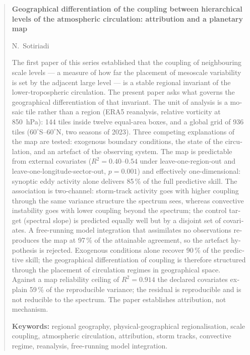\documentclass[11pt,a4paper]{article}
\begin{document}
\begin{english}
\begin{abstract}
\noindent\textbf{Geographical differentiation of the coupling between hierarchical levels of the
atmospheric circulation: attribution and a planetary map}

\smallskip\noindent N.~Sotiriadi

\smallskip\noindent The first paper of this series established that the coupling of neighbouring
scale levels --- a measure of how far the placement of mesoscale variability is set by the adjacent
large level --- is a stable regional invariant of the lower-tropospheric circulation. The present
paper asks what governs the geographical differentiation of that invariant. The unit of analysis is
a mosaic tile rather than a region (ERA5 reanalysis, relative vorticity at 850~hPa): 144 tiles inside
twelve equal-area boxes, and a global grid of 936 tiles ($60^\circ$S--$60^\circ$N, two seasons of
2023). Three competing explanations of the map are tested: exogenous boundary conditions, the state
of the circulation, and an artefact of the observing system. The map is predictable from external
covariates ($R^2=0.40$--$0.54$ under leave-one-region-out and leave-one-longitude-sector-out,
$p=0.001$) and effectively one-dimensional: synoptic eddy activity alone delivers 85\,\% of the full
predictive skill. The association is two-channel: storm-track activity goes with higher coupling
through the same variance structure the spectrum sees, whereas convective instability goes with lower
coupling beyond the spectrum; the control target (spectral slope) is predicted equally well but by a
disjoint set of covariates. A free-running model integration that assimilates no observations
reproduces the map at 97\,\% of the attainable agreement, so the artefact hypothesis is rejected.
Exogenous conditions alone recover 90\,\% of the predictive skill; the geographical differentiation
of coupling is therefore structured through the placement of circulation regimes in geographical
space. Against a map reliability ceiling of $R^2=0.914$ the declared covariates explain 59\,\% of
the reproducible variance; the residual is reproducible and is not reducible to the spectrum. The
paper establishes attribution, not mechanism.

\smallskip
\noindent\textbf{Keywords:} regional geography, physical-geographical regionalisation, scale
coupling, atmospheric circulation, attribution, storm tracks, convective regime, reanalysis,
free-running model integration.
\end{abstract}
\end{english}
\end{document}

